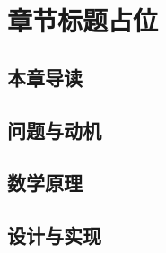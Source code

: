 %
%
% 
\chapter{章节标题占位}\label{ch:00}

\section{本章导读}

\section{问题与动机}

\section{数学原理}

\section{设计与实现}

